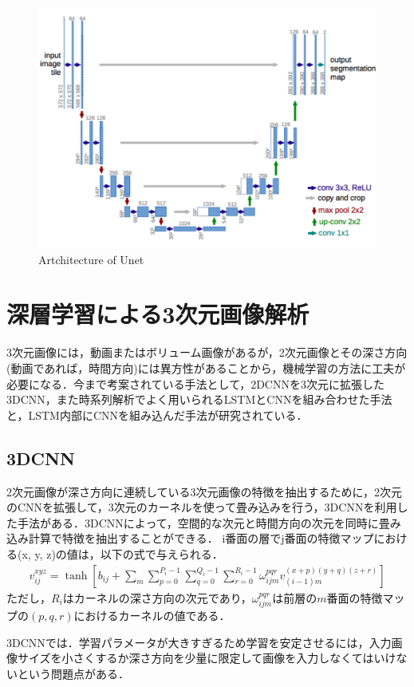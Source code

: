 \begin{figure}[H]
	\centering
	\includegraphics[width=0.7\linewidth]{fig/unet.png}
	\caption{Artchitecture of Unet\cite{Unet}}
	\label{fig:Unet}
\end{figure}


\section{深層学習による3次元画像解析}\label{sec:3Danalysis}
3次元画像には，動画またはボリューム画像があるが，2次元画像とその深さ方向(動画であれば，時間方向)には異方性があることから，機械学習の方法に工夫が必要になる．今まで考案されている手法として，2DCNNを3次元に拡張した3DCNN，また時系列解析でよく用いられるLSTMとCNNを組み合わせた手法と，LSTM内部にCNNを組み込んだ手法が研究されている．


\subsection{3DCNN}
2次元画像が深さ方向に連続している3次元画像の特徴を抽出するために，2次元のCNNを拡張して，3次元のカーネルを使って畳み込みを行う，3DCNNを利用した手法がある．3DCNNによって，空間的な次元と時間方向の次元を同時に畳み込み計算で特徴を抽出することができる\cite{ji20133d}．
i番面の層でj番面の特徴マップにおける(x, y, z)の値は，以下の式で与えられる．
\begin{align}\label{eq:3dcnn}
v_{ij}^{xyz} = \tanh \left[ b_{ij} + \sum_{m} \sum_{p=0}^{P_i -1} \sum_{q=0}^{Q_i -1} \sum_{r=0}^{R_i -1} \omega_{ijm}^{pqr} v_{(i-1)m}^{(x+p)(y+q)(z+r)}\right]
\end{align}
ただし，$R_i$はカーネルの深さ方向の次元であり，$\omega_{ijm}^{pqr}$は前層の$m$番面の特徴マップの$(p, q, r)$におけるカーネルの値である．

3DCNNでは．学習パラメータが大きすぎるため学習を安定させるには，入力画像サイズを小さくするか深さ方向を少量に限定して画像を入力しなくてはいけないという問題点がある．

